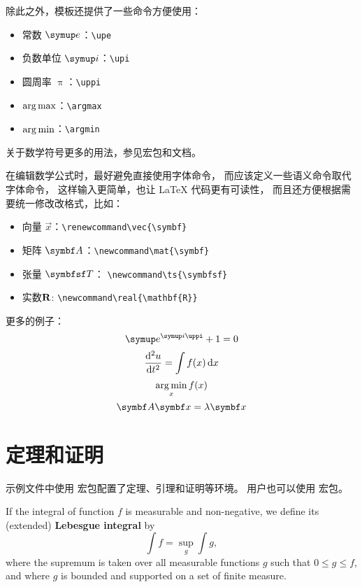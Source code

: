 除此之外，模板还提供了一些命令方便使用：
\begin{itemize}
  \item 常数 $\upe$：\verb|\upe|
  \item 负数单位 $\upi$：\verb|\upi|
  \item 圆周率 $\uppi$：\verb|\uppi|
  \item $\operatorname*{arg\,max}$：\verb|\argmax|
  \item $\operatorname*{arg\,min}$：\verb|\argmin|
\end{itemize}

关于数学符号更多的用法，参见宏包和文档。

在编辑数学公式时，最好避免直接使用字体命令，
而应该定义一些语义命令取代字体命令，
这样输入更简单，也让 \LaTeX{} 代码更有可读性，
而且还方便根据需要统一修改改格式，比如：
\begin{itemize}
  \item 向量 $\vec{x}$：\verb|\renewcommand\vec{\symbf}|
  \item 矩阵 $\mat{A}$：\verb|\newcommand\mat{\symbf}|
  \item 张量 $\ts{T}$： \verb|\newcommand\ts{\symbfsf}|
  \item 实数$\real$: \verb|\newcommand\real{\mathbf{R}}|
\end{itemize}

更多的例子：
\begin{equation}
  \upe^{\upi\uppi} + 1 = 0
\end{equation}
\begin{equation}
  \frac{\mathop{}\!\mathrm{d}^2 u}{\mathop{}\!\mathrm{d} t^2} = \int f(x) \mathop{}\!\mathrm{d} x
\end{equation}
\begin{equation}
  \operatorname*{arg\,min}_x f(x)
\end{equation}
\begin{equation}
  \mat{A} \vec{x} = \lambda \vec{x}
\end{equation}


\section{定理和证明}

示例文件中使用  宏包配置了定理、引理和证明等环境。
用户也可以使用   宏包。

\begin{definition}
  If the integral of function $f$ is measurable and non-negative, we define
  its (extended) \textbf{Lebesgue integral} by
  \begin{equation}
    \int f = \sup_g \int g,
  \end{equation}
  where the supremum is taken over all measurable functions $g$ such that
  $0 \le g \le f$, and where $g$ is bounded and supported on a set of
  finite measure.
\end{definition}

